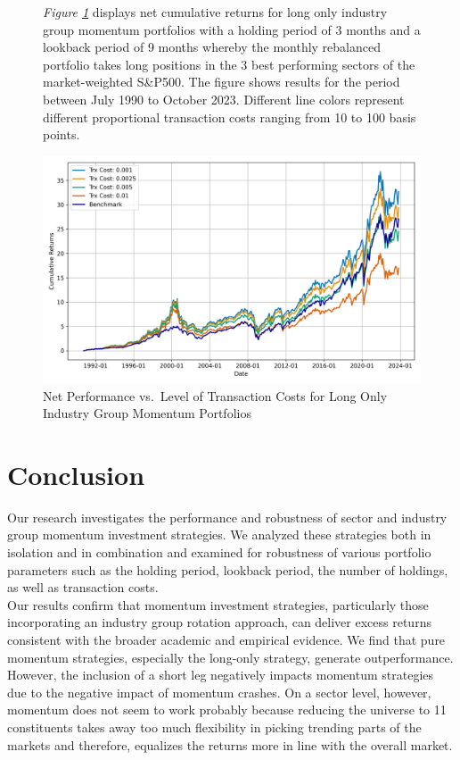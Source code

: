 \documentclass[a4paper,12pt,twoside]{article}
\begin{document}
\begin{figure}[H]
           \captionsetup{justification=centering}
   \caption{Net Performance vs.~Level of Transaction Costs for Long Only Industry Group Momentum Portfolios}
    \label{fig_03}
    \textit{Figure \ref{fig_03}} displays net cumulative returns for long only industry group momentum portfolios with a holding period of 3 months and a lookback period of 9 months whereby the monthly rebalanced portfolio takes long positions in the 3 best performing sectors of the market-weighted S\&P500. The figure shows results for the period between July 1990 to October 2023. Different line colors represent different proportional transaction costs ranging from 10 to 100 basis points.
    \centerline{\includegraphics[width=1\textwidth]{Plots/robustness_check_tc.png}}
\end{figure} 

\newpage
\section{Conclusion}
    Our research investigates the performance and robustness of sector and industry group momentum investment strategies. We analyzed these strategies both in isolation and in combination and examined for robustness of various portfolio parameters such as the holding period, lookback period, the number of holdings, as well as transaction costs.\\

    Our results confirm that momentum investment strategies, particularly those incorporating an industry group rotation approach, can deliver excess returns consistent with the broader academic and empirical evidence. We find that pure momentum strategies, especially the long-only strategy, generate outperformance. However, the inclusion of a short leg negatively impacts momentum strategies due to the negative impact of momentum crashes. On a sector level, however, momentum does not seem to work probably because reducing the universe to 11 constituents takes away too much flexibility in picking trending parts of the markets and therefore, equalizes the returns more in line with the overall market.\\
\end{document}
